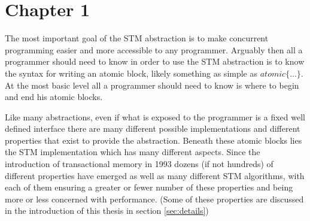 \documentclass[runningheads,a4paper]{article}
\begin{document}
\section{Chapter 1}
The most important goal of the STM abstraction is to make concurrent programming
easier and more accessible to any programmer.
Arguably then all a programmer should need to know in order to use the STM abstraction is to know
the syntax for writing an atomic block, likely something as simple as
$atomic \{ \dots \} $.
At the most basic level all a programmer should need to know is where
to begin and end his atomic blocks.







Like many abstractions, even if what is exposed to the programmer is a fixed well
defined interface there are many different possible implementations and different
properties that exist to provide the abstraction.
Beneath these atomic blocks lies the STM implementation which has many different aspects.
Since the introduction of transactional memory in 1993 \cite{HM93} dozens (if not hundreds) of different properties have emerged
as well as many different STM algorithms,
with each of them ensuring a greater or fewer number of these properties and being more or less
concerned with performance.
(Some of these properties are discussed in the introduction of this thesis in section \ref{sec:details})
\end{document}

